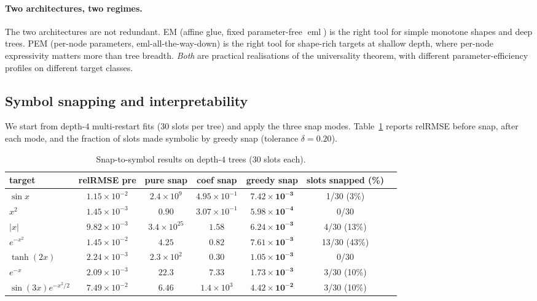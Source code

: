 \documentclass[11pt]{article}
\newcommand{\eml}{\operatorname{eml}}
\begin{document}
\paragraph{Two architectures, two regimes.}
The two architectures are not redundant. EM (affine glue, fixed
parameter-free $\eml$) is the right tool for simple monotone shapes and
deep trees. PEM (per-node parameters, eml-all-the-way-down) is the right
tool for shape-rich targets at shallow depth, where per-node expressivity
matters more than tree breadth. \emph{Both} are practical realisations of
the universality theorem, with different parameter-efficiency profiles on
different target classes.

\subsection{Symbol snapping and interpretability}
\label{sec:snap-results}

We start from depth-$4$ multi-restart fits ($30$ slots per tree) and apply
the three snap modes. Table~\ref{tab:snap} reports relRMSE before snap,
after each mode, and the fraction of slots made symbolic by greedy snap
(tolerance $\delta = 0.20$).

\begin{table}[h]
\centering\small
\caption{Snap-to-symbol results on depth-$4$ trees ($30$ slots each).}
\label{tab:snap}
\begin{tabular}{lcccccc}
\toprule
target & relRMSE pre & pure snap & coef snap & greedy snap & slots snapped (\%) \\
\midrule
$\sin x$              & $1.15\!\times\!10^{-2}$ & $2.4\!\times\!10^{9}$  & $4.95\!\times\!10^{-1}$ & $\mathbf{7.42\!\times\!10^{-3}}$ & 1/30 (3\%) \\
$x^2$                 & $1.45\!\times\!10^{-3}$ & $0.90$  & $3.07\!\times\!10^{-1}$ & $\mathbf{5.98\!\times\!10^{-4}}$ & 0/30 \\
$|x|$                 & $9.82\!\times\!10^{-3}$ & $3.4\!\times\!10^{25}$ & $1.58$               & $\mathbf{6.24\!\times\!10^{-3}}$ & 4/30 (13\%) \\
$e^{-x^2}$            & $1.45\!\times\!10^{-2}$ & $4.25$  & $0.82$               & $\mathbf{7.61\!\times\!10^{-3}}$ & 13/30 (43\%) \\
$\tanh(2x)$           & $2.24\!\times\!10^{-3}$ & $2.3\!\times\!10^{2}$  & $0.30$               & $\mathbf{1.05\!\times\!10^{-3}}$ & 0/30 \\
$e^{-x}$              & $2.09\!\times\!10^{-3}$ & $22.3$  & $7.33$               & $\mathbf{1.73\!\times\!10^{-3}}$ & 3/30 (10\%) \\
$\sin(3x)e^{-x^2/2}$  & $7.49\!\times\!10^{-2}$ & $6.46$  & $1.4\!\times\!10^{3}$  & $\mathbf{4.42\!\times\!10^{-2}}$ & 3/30 (10\%) \\
\bottomrule
\end{tabular}
\end{table}
\end{document}

